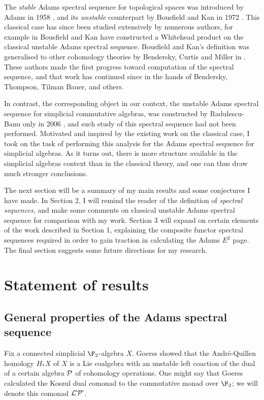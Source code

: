 \documentclass[11pt]{article}
\theoremstyle{plain}
\begin{document}
The \emph{stable} Adams spectral sequence for topological spaces  was introduced by Adams in 1958 \cite{MR0096219}, and its \emph{unstable} counterpart by Bousfield and Kan in 1972 \cite{BousKanSSeq.pdf,BK_pairings.pdf}. This classical case has since been studied extensively by numerous authors, for example in \cite{BK_pairings_products.pdf} Bousfield and Kan have constructed a Whitehead product on the classical unstable Adams spectral sequence. Bousfield and Kan's definition was generalised to other cohomology theories by Bendersky, Curtis and Miller in \cite{BendCurtisMiller.pdf}. These authors made the first progress toward computation of the spectral sequence, and that work has continued since in the hands of Bendersky, Thompson, Tilman Bauer, and others. 


In contrast, the corresponding object in our context, the unstable Adams spectral sequence for simplicial commutative algebras, was constructed by Radulescu-Banu only in 2006 \cite{radelescuBanu.pdf}, and such study of this spectral sequence had not been performed. %
Motivated and inspired by the existing work on the classical case, I took on the task of performing this analysis for the Adams spectral sequence for simplicial algebras. As it turns out, there is more structure available in the simplicial algebras context than in the classical theory, and one can thus draw much stronger conclusions.

The next section will be a summary of my main results and some conjectures I have made. In Section 2, I will remind the reader of the definition of \emph{spectral sequences}, and make some comments on classical unstable Adams spectral sequence for comparison with my work. Section 3 will expand on certain elements of the work described in Section 1, explaining the composite functor spectral sequences required in order to gain traction in calculating the Adams $E^2$ page. The final section suggests some future directions for my research.
\section{Statement of results}
\subsection{General properties of the Adams spectral sequence}
Fix a connected simplicial $\F_2$-algebra $X$.
Goerss \cite{MR1089001} showed that the Andr\'e-Quillen homology $H_*X$ of $X$ is a Lie coalgebra with an unstable left coaction of the dual of a certain algebra $\mathcal{P}$ of cohomology operations. One might say that Goerss calculated the Koszul dual comonad to the commutative monad over $\F_2$; we will denote this comonad $\mathcal{L}\hat{\,}\mathcal{P}\hat{\,}$.
\end{document}
